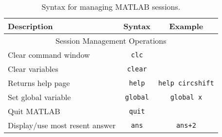 \begin{table}[b]%
	\centering
	\begin{tabularx}{4.1in}{lcc}
	\toprule
		Description & Syntax & Example\\
	\midrule
		 \multicolumn{3}{c}{Session Management Operations}\\
	\midrule
		Clear command window & {\lstinline[style=Matlab-editor]!clc!} &  \\
		Clear variables & {\lstinline[style=Matlab-editor]!clear!} & \\
		Returns help page & {\lstinline[style=Matlab-editor]!help!} &  {\lstinline[style=Matlab-editor]!help circshift!} \\
		Set global variable & {\lstinline[style=Matlab-editor]!global!} &  {\lstinline[style=Matlab-editor]!global x!} \\
		Quit MATLAB & {\lstinline[style=Matlab-editor]!quit!} &  \\
		Display/use most resent answer & {\lstinline[style=Matlab-editor]!ans!} &  {\lstinline[style=Matlab-editor]!ans+2!}\\
	\midrule
	\end{tabularx}
	\caption{Syntax for managing MATLAB sessions.}
	\label{tab:SessionMATLABSyntax}
\end{table}